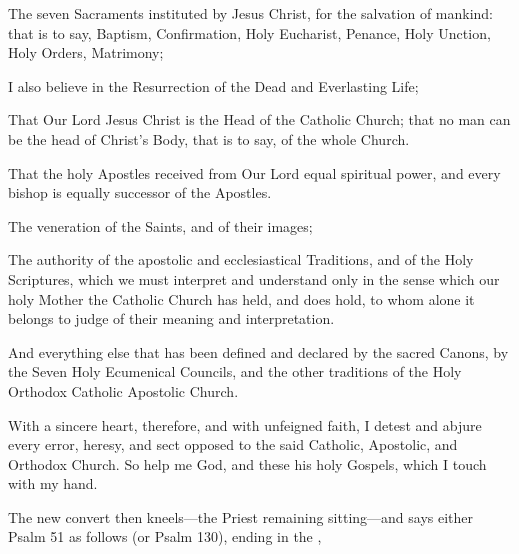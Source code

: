The seven Sacraments instituted by Jesus Christ, for the salvation of mankind: that is to say, Baptism, Confirmation, Holy Eucharist, Penance, 
Holy Unction, Holy Orders, Matrimony;

I also believe in 
the Resurrection of the Dead and Everlasting Life;

That Our Lord Jesus Christ is the Head of the Catholic Church; that no man can be the head of Christ's Body, that is to say, of the whole Church.

That the holy Apostles received from Our Lord equal spiritual power, and every bishop is equally successor of the Apostles.

The veneration of the Saints, and of their images;

The authority of the apostolic and ecclesiastical Traditions, and of the Holy Scriptures, which we must interpret and understand only in the sense which our holy Mother the Catholic Church has held, and does hold, to whom alone it belongs to judge of their meaning and interpretation.

And everything else that has been defined and declared by the sacred Canons, by the 
Seven Holy Ecumenical Councils, and the other traditions of the Holy Orthodox Catholic Apostolic Church.%

With a sincere heart, therefore, and with unfeigned faith, I detest and abjure every error, heresy, and sect opposed to the said Catholic, Apostolic, and 
Orthodox Church. So help me God, and these his holy Gospels, which I touch with my hand.
\begin{rubric}
    The new convert then kneels---the Priest remaining sitting---and says either Psalm 51 as follows (or Psalm 130), ending in the ,
\end{rubric}
